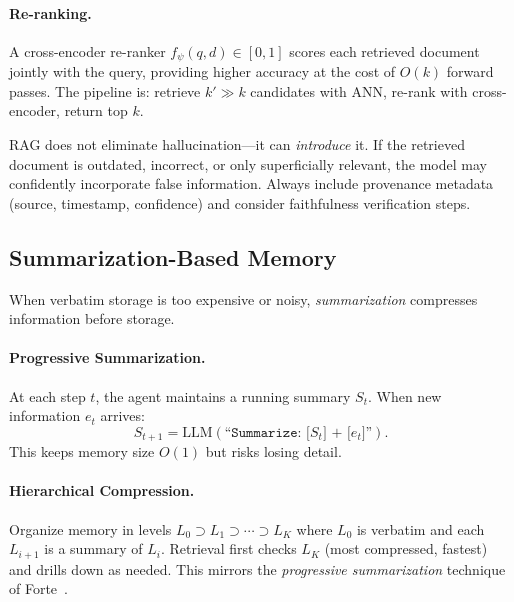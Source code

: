 \paragraph{Re-ranking.}
\label{re-ranking.}

A cross-encoder re-ranker $f_\psi(q, d) \in [0,1]$ scores each retrieved document jointly with the query, providing higher accuracy at the cost of $O(k)$ forward passes. The pipeline is: retrieve $k' \gg k$ candidates with ANN, re-rank with cross-encoder, return top $k$.

\begin{warningbox}
RAG does not eliminate hallucination---it can \emph{introduce} it. If the retrieved document is outdated, incorrect, or only superficially relevant, the model may confidently incorporate false information. Always include provenance metadata (source, timestamp, confidence) and consider faithfulness verification steps.
\end{warningbox}

\subsection{Summarization-Based Memory}
\label{summarization-based-memory}

When verbatim storage is too expensive or noisy, \emph{summarization} compresses information before storage.

\paragraph{Progressive Summarization.}
\label{progressive-summarization.}

At each step $t$, the agent maintains a running summary $S_t$. When new information $e_t$ arrives: 
\[
S_{t+1} = \text{LLM}\!\left(\texttt{``Summarize: [}S_t\texttt{] + [}e_t\texttt{]''}\right).
\]
 This keeps memory size $O(1)$ but risks losing detail.

\paragraph{Hierarchical Compression.}
\label{hierarchical-compression.}

Organize memory in levels $L_0 \supset L_1 \supset \cdots \supset L_K$ where $L_0$ is verbatim and each $L_{i+1}$ is a summary of $L_i$. Retrieval first checks $L_K$ (most compressed, fastest) and drills down as needed. This mirrors the \emph{progressive summarization} technique of Forte~\cite{forte2022building}.


